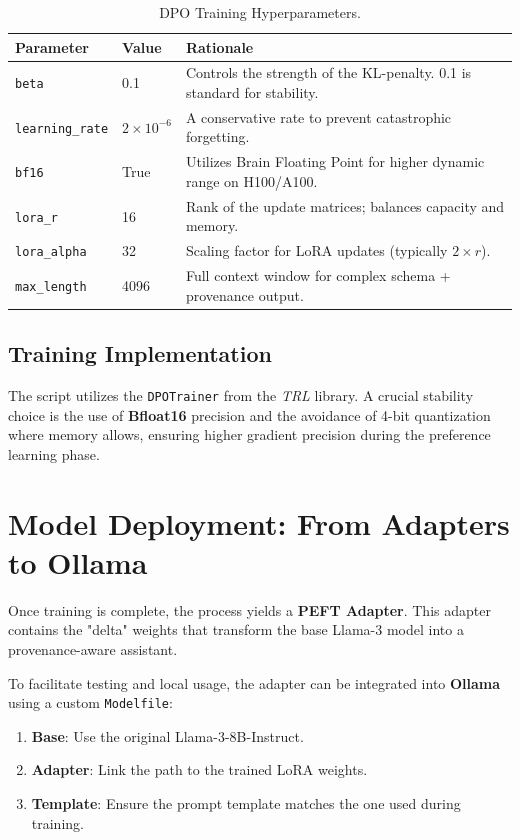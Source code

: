 \documentclass{article}
\begin{document}
\begin{table}[h]
\centering
\begin{tabular}{@{}lll@{}}
\toprule
\textbf{Parameter} & \textbf{Value} & \textbf{Rationale} \\ \midrule
\texttt{beta} & 0.1 & Controls the strength of the KL-penalty. 0.1 is standard for stability. \\
\texttt{learning\_rate} & $2 \times 10^{-6}$ & A conservative rate to prevent catastrophic forgetting. \\
\texttt{bf16} & True & Utilizes Brain Floating Point for higher dynamic range on H100/A100. \\
\texttt{lora\_r} & 16 & Rank of the update matrices; balances capacity and memory. \\
\texttt{lora\_alpha} & 32 & Scaling factor for LoRA updates (typically $2 \times r$). \\
\texttt{max\_length} & 4096 & Full context window for complex schema + provenance output. \\ \bottomrule
\end{tabular}
\caption{DPO Training Hyperparameters.}
\end{table}

\subsection{Training Implementation}
The script utilizes the \texttt{DPOTrainer} from the \textit{TRL} library. A crucial stability choice is the use of \textbf{Bfloat16} precision and the avoidance of 4-bit quantization where memory allows, ensuring higher gradient precision during the preference learning phase.

\section{Model Deployment: From Adapters to Ollama}
Once training is complete, the process yields a \textbf{PEFT Adapter}. This adapter contains the "delta" weights that transform the base Llama-3 model into a provenance-aware assistant.

To facilitate testing and local usage, the adapter can be integrated into \textbf{Ollama} using a custom \texttt{Modelfile}:
\begin{enumerate}
    \item \textbf{Base}: Use the original Llama-3-8B-Instruct.
    \item \textbf{Adapter}: Link the path to the trained LoRA weights.
    \item \textbf{Template}: Ensure the prompt template matches the one used during training.
\end{enumerate}



\end{document}

